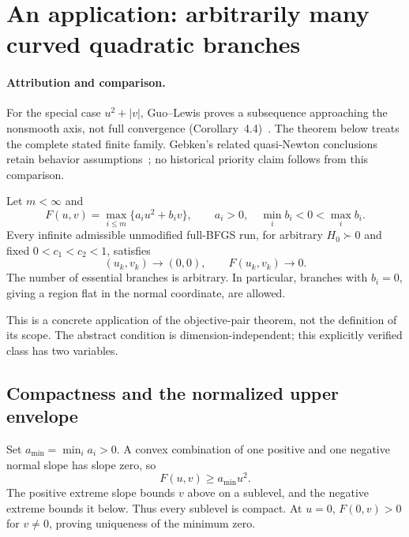 \begingroup
\providecommand{\R}{}
\renewcommand{\R}{\mathbb R}
\providecommand{\tr}{}
\renewcommand{\tr}{\operatorname{tr}}
\providecommand{\diag}{}
\renewcommand{\diag}{\operatorname{diag}}
\providecommand{\Span}{}
\renewcommand{\Span}{\operatorname{span}}
\providecommand{\ip}{}
\renewcommand{\ip}[2]{\langle #1,#2\rangle}
\providecommand{\norm}{}
\renewcommand{\norm}[1]{\lVert #1\rVert}
\providecommand{\T}{}
\renewcommand{\T}{^{\mathsf T}}
\providecommand{\D}{}
\renewcommand{\D}{\mathcal D}
\setcounter{section}{4}
\setcounter{theorem}{1}
\setcounter{lemma}{0}
\setcounter{corollary}{0}
\setcounter{proposition}{0}
\setcounter{remark}{0}
\setcounter{equation}{6}
\section{An application: arbitrarily many curved quadratic branches}
\paragraph{Attribution and comparison.}
For the special case $u^2+|v|$, Guo--Lewis proves a subsequence approaching the nonsmooth axis, not full convergence (Corollary~4.4)~\cite{GL18}. The theorem below treats the complete stated finite family. Gebken's related quasi-Newton conclusions retain behavior assumptions~\cite{BG}; no historical priority claim follows from this comparison.

\begin{theorem}
Let $m<\infty$ and
\[
 F(u,v)=\max_{i\le m}\{a_i u^2+b_i v\},\qquad
 a_i>0,\quad\min_i b_i<0<\max_i b_i.
\]
Every infinite admissible unmodified full-BFGS run, for arbitrary $H_0\succ0$ and fixed $0<c_1<c_2<1$, satisfies
\[
 (u_k,v_k)\to(0,0),\qquad F(u_k,v_k)\to0.
\]
The number of essential branches is arbitrary. In particular, branches with $b_i=0$, giving a region flat in the normal coordinate, are allowed.
\end{theorem}
This is a concrete application of the objective-pair theorem, not the definition of its scope. The abstract condition is dimension-independent; this explicitly verified class has two variables.

\subsection{Compactness and the normalized upper envelope}
Set $a_{\min}=\min_i a_i>0$. A convex combination of one positive and one negative normal slope has slope zero, so
\[
 F(u,v)\ge a_{\min}u^2.
\]
The positive extreme slope bounds $v$ above on a sublevel, and the negative extreme bounds it below. Thus every sublevel is compact. At $u=0$, $F(0,v)>0$ for $v\ne0$, proving uniqueness of the minimum zero.

